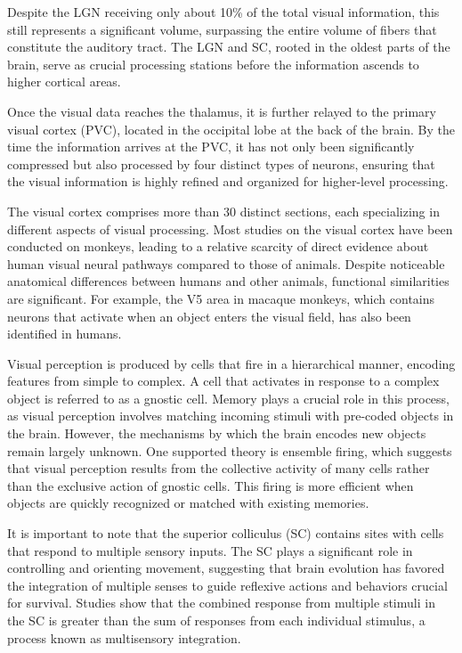 \documentclass[12pt]{article}
\begin{document}
Despite the LGN receiving only about 10\% of the total visual information, this still represents a significant volume, surpassing the entire volume of fibers that constitute the auditory tract. The LGN and SC, rooted in the oldest parts of the brain, serve as crucial processing stations before the information ascends to higher cortical areas.

Once the visual data reaches the thalamus, it is further relayed to the primary visual cortex (PVC), located in the occipital lobe at the back of the brain. By the time the information arrives at the PVC, it has not only been significantly compressed but also processed by four distinct types of neurons, ensuring that the visual information is highly refined and organized for higher-level processing.


The visual cortex comprises more than 30 distinct sections, each specializing in different aspects of visual processing. Most studies on the visual cortex have been conducted on monkeys, leading to a relative scarcity of direct evidence about human visual neural pathways compared to those of animals. Despite noticeable anatomical differences between humans and other animals, functional similarities are significant. For example, the V5 area in macaque monkeys, which contains neurons that activate when an object enters the visual field, has also been identified in humans.

Visual perception is produced by cells that fire in a hierarchical manner, encoding features from simple to complex. A cell that activates in response to a complex object is referred to as a gnostic cell. Memory plays a crucial role in this process, as visual perception involves matching incoming stimuli with pre-coded objects in the brain. However, the mechanisms by which the brain encodes new objects remain largely unknown. One supported theory is ensemble firing, which suggests that visual perception results from the collective activity of many cells rather than the exclusive action of gnostic cells. This firing is more efficient when objects are quickly recognized or matched with existing memories.

It is important to note that the superior colliculus (SC) contains sites with cells that respond to multiple sensory inputs. The SC plays a significant role in controlling and orienting movement, suggesting that brain evolution has favored the integration of multiple senses to guide reflexive actions and behaviors crucial for survival. Studies show that the combined response from multiple stimuli in the SC is greater than the sum of responses from each individual stimulus, a process known as multisensory integration.
\end{document}
